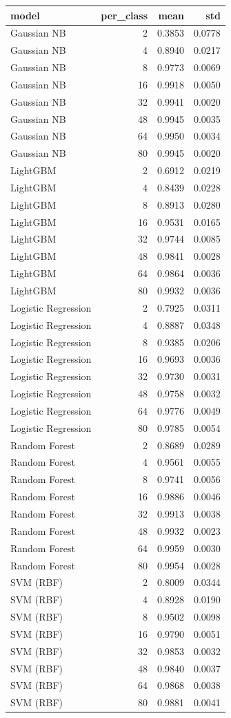 \begin{tabular}{lrrr}
\toprule
model & per_class & mean & std \\
\midrule
Gaussian NB & 2 & 0.3853 & 0.0778 \\
Gaussian NB & 4 & 0.8940 & 0.0217 \\
Gaussian NB & 8 & 0.9773 & 0.0069 \\
Gaussian NB & 16 & 0.9918 & 0.0050 \\
Gaussian NB & 32 & 0.9941 & 0.0020 \\
Gaussian NB & 48 & 0.9945 & 0.0035 \\
Gaussian NB & 64 & 0.9950 & 0.0034 \\
Gaussian NB & 80 & 0.9945 & 0.0020 \\
LightGBM & 2 & 0.6912 & 0.0219 \\
LightGBM & 4 & 0.8439 & 0.0228 \\
LightGBM & 8 & 0.8913 & 0.0280 \\
LightGBM & 16 & 0.9531 & 0.0165 \\
LightGBM & 32 & 0.9744 & 0.0085 \\
LightGBM & 48 & 0.9841 & 0.0028 \\
LightGBM & 64 & 0.9864 & 0.0036 \\
LightGBM & 80 & 0.9932 & 0.0036 \\
Logistic Regression & 2 & 0.7925 & 0.0311 \\
Logistic Regression & 4 & 0.8887 & 0.0348 \\
Logistic Regression & 8 & 0.9385 & 0.0206 \\
Logistic Regression & 16 & 0.9693 & 0.0036 \\
Logistic Regression & 32 & 0.9730 & 0.0031 \\
Logistic Regression & 48 & 0.9758 & 0.0032 \\
Logistic Regression & 64 & 0.9776 & 0.0049 \\
Logistic Regression & 80 & 0.9785 & 0.0054 \\
Random Forest & 2 & 0.8689 & 0.0289 \\
Random Forest & 4 & 0.9561 & 0.0055 \\
Random Forest & 8 & 0.9741 & 0.0056 \\
Random Forest & 16 & 0.9886 & 0.0046 \\
Random Forest & 32 & 0.9913 & 0.0038 \\
Random Forest & 48 & 0.9932 & 0.0023 \\
Random Forest & 64 & 0.9959 & 0.0030 \\
Random Forest & 80 & 0.9954 & 0.0028 \\
SVM (RBF) & 2 & 0.8009 & 0.0344 \\
SVM (RBF) & 4 & 0.8928 & 0.0190 \\
SVM (RBF) & 8 & 0.9502 & 0.0098 \\
SVM (RBF) & 16 & 0.9790 & 0.0051 \\
SVM (RBF) & 32 & 0.9853 & 0.0032 \\
SVM (RBF) & 48 & 0.9840 & 0.0037 \\
SVM (RBF) & 64 & 0.9868 & 0.0038 \\
SVM (RBF) & 80 & 0.9881 & 0.0041 \\
\bottomrule
\end{tabular}
